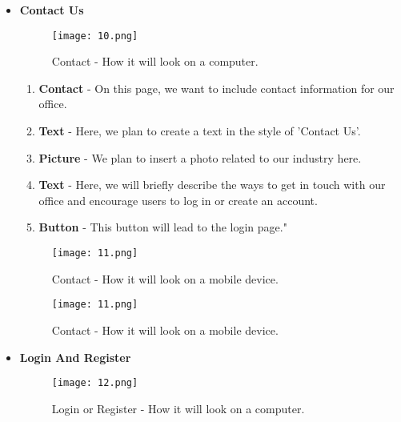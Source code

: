 \documentclass{article}
\begin{document}
\begin{itemize}
\clearpage    
    \item \textbf{Contact Us} \par


\begin{figure}[h]
    \centering
    \texttt{[image: 10.png]}
    \caption{Contact - How it will look on a computer.}
    \label{fig:enter-label}
\end{figure}

\begin{enumerate}
    \item \textbf{Contact} - On this page, we want to include contact information for our office.
    \item \textbf{Text} - Here, we plan to create a text in the style of 'Contact Us'.
    \item \textbf{Picture}  - We plan to insert a photo related to our industry here.
    \item \textbf{Text}  - Here, we will briefly describe the ways to get in touch with our office and encourage users to log in or create an account.
    \item \textbf{Button} - This button will lead to the login page."
\end{enumerate} 
\clearpage 
\begin{figure}[h]
    \centering
    \texttt{[image: 11.png]}
    \caption{Contact - How it will look on a mobile device.}
    \label{fig:enter-label}
\end{figure}


    

\begin{figure}[h]
    \centering
    \texttt{[image: 11.png]}
    \caption{Contact - How it will look on a mobile device.}
    \label{fig:enter-label}
\end{figure}

\clearpage 
    \item \textbf{Login And Register} \par
    
\begin{figure}[h]
    \centering
    \texttt{[image: 12.png]}
    \caption{Login or Register - How it will look on a computer.}
    \label{fig:enter-label}
\end{figure}


\end{itemize}
\end{document}
